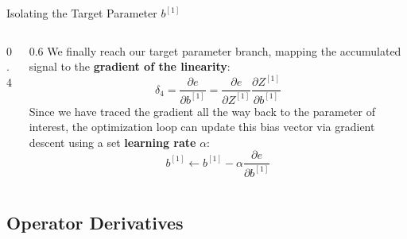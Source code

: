 \begin{frame}{Isolating the Target Parameter $b^{[1]}$}
\begin{columns}
\begin{column}{0.4\textwidth}
\begin{center}
{\begin{tikzpicture}
					\end{tikzpicture}
				}
			\end{center}
		\end{column}
		\begin{column}{0.6\textwidth}
			We finally reach our target parameter branch, mapping the accumulated signal to the \textbf{\textcolor{lime!80!black}{gradient of the linearity}}:
			\begin{equation*}
				\delta_4 = \frac{\partial{e}}{\partial{b^{[1]}}} = \frac{\partial{e}}{\partial{Z^{[1]}}} \frac{\partial{Z^{[1]}}}{\partial{b^{[1]}}}
			\end{equation*}
			Since we have traced the gradient all the way back to the parameter of interest, the optimization loop can update this bias vector via gradient descent using a set \textbf{learning rate} $\alpha$:
			\begin{equation*}
				b^{[1]} \leftarrow b^{[1]} - \alpha \frac{\partial{e}}{\partial{b^{[1]}}}
			\end{equation*}
		\end{column}
	\end{columns}
\end{frame}

\subsection[Operator Derivatives]{Operator Derivatives}

